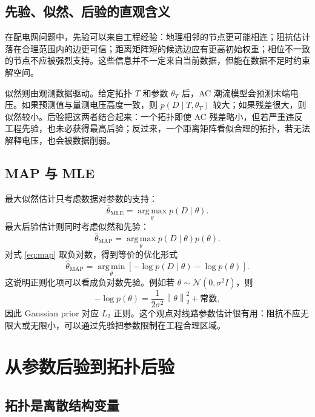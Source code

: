 \documentclass[UTF8,12pt,openany]{ctexrep}
\numberwithin{equation}{chapter}
\theoremstyle{definition}
\theoremstyle{plain}
\newcommand{\argmin}{\operatorname*{arg\,min}}
\newcommand{\argmax}{\operatorname*{arg\,max}}
\newcommand{\norm}[2][]{\left\lVert #2 \right\rVert_{#1}}
\begin{document}
\section{先验、似然、后验的直观含义}

在配电网问题中，先验可以来自工程经验：地理相邻的节点更可能相连；阻抗估计落在合理范围内的边更可信；距离矩阵短的候选边应有更高初始权重；相位不一致的节点不应被强烈支持。这些信息并不一定来自当前数据，但能在数据不足时约束解空间。

似然则由观测数据驱动。给定拓扑 $T$ 和参数 $\theta_T$ 后，AC 潮流模型会预测末端电压。如果预测值与量测电压高度一致，则 $p(D\mid T,\theta_T)$ 较大；如果残差很大，则似然较小。后验把这两者结合起来：一个拓扑即使 AC 残差略小，但若严重违反工程先验，也未必获得最高后验；反过来，一个距离矩阵看似合理的拓扑，若无法解释电压，也会被数据削弱。

\section{MAP 与 MLE}

最大似然估计只考虑数据对参数的支持：
\begin{equation}
\hat{\theta}_{\mathrm{MLE}}
=\argmax_{\theta}p(D\mid\theta).
\label{eq:mle}
\end{equation}
最大后验估计则同时考虑似然和先验：
\begin{equation}
\hat{\theta}_{\mathrm{MAP}}
=\argmax_{\theta}p(D\mid\theta)p(\theta).
\label{eq:map}
\end{equation}
对式 \eqref{eq:map} 取负对数，得到等价的优化形式
\begin{equation}
\hat{\theta}_{\mathrm{MAP}}
=\argmin_{\theta}
\left[
-\log p(D\mid\theta)-\log p(\theta)
\right].
\label{eq:map-negative-log}
\end{equation}
这说明正则化项可以看成负对数先验。例如若 $\theta\sim\mathcal{N}(0,\sigma^2 I)$，则
\begin{equation}
-\log p(\theta)
=\frac{1}{2\sigma^2}\norm[2]{\theta}^2+\text{常数},
\end{equation}
因此 Gaussian prior 对应 $L_2$ 正则。这个观点对线路参数估计很有用：阻抗不应无限大或无限小，可以通过先验把参数限制在工程合理区域。

\chapter{从参数后验到拓扑后验}

\section{拓扑是离散结构变量}
\end{document}
